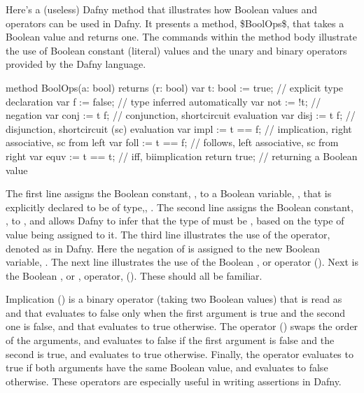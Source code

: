 \documentclass[letterpaper,10pt,english]{sphinxmanual}
\begin{document}
Here’s a (useless) Dafny method that illustrates how Boolean values
and operators can be used in Dafny. It presents a method, \$BoolOps\$,
that takes a Boolean value and returns one. The commands within the
method body illustrate the use of Boolean constant (literal) values
and the unary and binary operators provided by the Dafny language.

\begin{sphinxVerbatim}[commandchars=\\\{\}]
method BoolOps(a: bool) returns (r: bool)
\PYGZob{}
    var t: bool := true;    // explicit type declaration
    var f := false;         // type inferred automatically
    var not := !t;          // negation
    var conj := t \PYGZam{}\PYGZam{} f;     // conjunction, short\PYGZhy{}circuit evaluation
    var disj := t \textbar{}\textbar{} f;     // disjunction, short\PYGZhy{}circuit (sc) evaluation
    var impl := t ==\PYGZgt{} f;    // implication, right associative, sc from left
    var foll := t \PYGZlt{}== f;    // follows, left associative, sc from right
    var equv := t \PYGZlt{}==\PYGZgt{} t;   // iff, bi\PYGZhy{}implication
    return true;            // returning a Boolean value
 \PYGZcb{}
\end{sphinxVerbatim}

The first line assigns the Boolean constant, , to a Boolean
variable, , that is explicitly declared to be of type,, .
The second line assigns the Boolean constant, , to , and
allows Dafny to infer that the type of  must be , based on
the type of value being assigned to it. The third line illustrates the
use of the  operator, denoted as \sphinxstyleemphasis{!} in Dafny. Here the
negation of  is assigned to the new Boolean variable, . The
next line illustrates the use of the Boolean , or 
operator (\sphinxstyleemphasis{\&\&}). Next is the Boolean , or , operator,
(\sphinxstyleemphasis{\textbar{}\textbar{}}). These should all be familiar.

Implication (\sphinxstyleemphasis{==\textgreater{}}) is a binary operator (taking two Boolean values)
that is read as  and that evaluates to false only when the
first argument is true and the second one is false, and that evaluates
to true otherwise. The  operator (\sphinxstyleemphasis{\textless{}==}) swaps the order of
the arguments, and evaluates to false if the first argument is false
and the second is true, and evaluates to true otherwise. Finally, the
 operator evaluates to true if both arguments have the
same Boolean value, and evaluates to false otherwise. These operators
are especially useful in writing assertions in Dafny.
\end{document}
